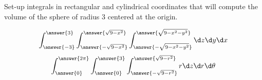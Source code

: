\documentclass{ximera}
\author{Bart Snapp}
\begin{document}
\begin{exercise}
  Set-up integrals in rectangular and cylindrical coordinates that
  will compute the volume of the sphere of radius $3$ centered at the origin. 
  \begin{prompt}
  \[
  \int_{\answer{-3}}^{\answer{3}}\int_{\answer{-\sqrt{9-x^2}}}^{\answer{\sqrt{9-x^2}}}\int_{\answer{-\sqrt{9-x^2-y^2}}}^{\answer{\sqrt{9-x^2-y^2}}}\d z \d y \d x
  \]
  \[
  \int_{\answer{0}}^{\answer{2\pi}}\int_{\answer{0}}^{\answer{3}}\int_{\answer{-\sqrt{9-r^2}}}^{\answer{\sqrt{9-r^2}}}   r\d z \d r \d \theta
  \]
  \end{prompt}
\end{exercise}
\end{document}
